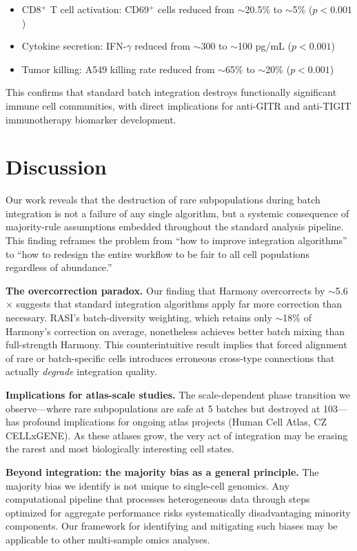 \documentclass[10pt]{article}
\begin{document}
\begin{itemize}
\item CD8$^+$ T cell activation: CD69$^+$ cells reduced from $\sim$20.5\% to $\sim$5\% ($p < 0.001$)
\item Cytokine secretion: IFN-$\gamma$ reduced from $\sim$300 to $\sim$100 pg/mL ($p < 0.001$)
\item Tumor killing: A549 killing rate reduced from $\sim$65\% to $\sim$20\% ($p < 0.001$)
\end{itemize}

This confirms that standard batch integration destroys functionally significant immune cell communities, with direct implications for anti-GITR and anti-TIGIT immunotherapy biomarker development.

\section{Discussion}

Our work reveals that the destruction of rare subpopulations during batch integration is not a failure of any single algorithm, but a systemic consequence of majority-rule assumptions embedded throughout the standard analysis pipeline. This finding reframes the problem from ``how to improve integration algorithms'' to ``how to redesign the entire workflow to be fair to all cell populations regardless of abundance.''

\textbf{The overcorrection paradox.} Our finding that Harmony overcorrects by $\sim$5.6$\times$ suggests that standard integration algorithms apply far more correction than necessary. RASI's batch-diversity weighting, which retains only $\sim$18\% of Harmony's correction on average, nonetheless achieves better batch mixing than full-strength Harmony. This counterintuitive result implies that forced alignment of rare or batch-specific cells introduces erroneous cross-type connections that actually \textit{degrade} integration quality.

\textbf{Implications for atlas-scale studies.} The scale-dependent phase transition we observe---where rare subpopulations are safe at 5 batches but destroyed at 103---has profound implications for ongoing atlas projects (Human Cell Atlas, CZ CELLxGENE). As these atlases grow, the very act of integration may be erasing the rarest and most biologically interesting cell states.

\textbf{Beyond integration: the majority bias as a general principle.} The majority bias we identify is not unique to single-cell genomics. Any computational pipeline that processes heterogeneous data through steps optimized for aggregate performance risks systematically disadvantaging minority components. Our framework for identifying and mitigating such biases may be applicable to other multi-sample omics analyses.
\end{document}
